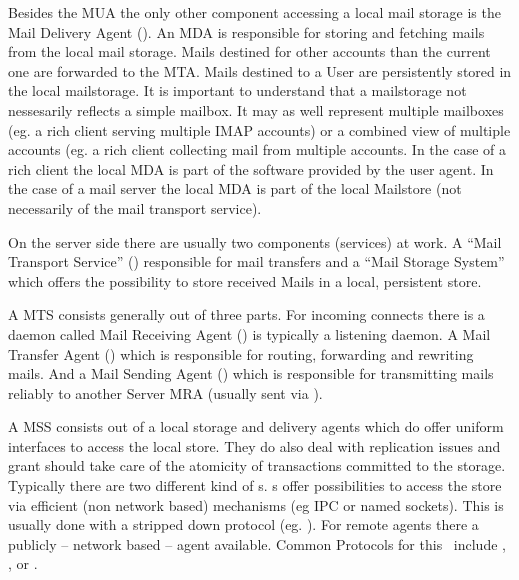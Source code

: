 Besides the MUA the only other component accessing a local mail storage is the Mail Delivery Agent (). An MDA is responsible for storing and fetching mails from the local mail storage. Mails destined for other accounts than the current one are forwarded to the MTA. Mails destined to a User are persistently stored  in the local mailstorage. It is important to understand that a mailstorage not nessesarily reflects a simple mailbox. It may as well represent multiple mailboxes (eg. a rich client serving multiple IMAP accounts) or a combined view of multiple accounts (eg. a rich client collecting mail from multiple  accounts. In the case of a rich client the local MDA is part of the software provided by the user agent. In the case of a mail server the local MDA is part of the local Mailstore (not necessarily of the mail transport service).

On the server side there are usually two components (services) at work. A ``Mail Transport Service'' () responsible for mail transfers and a ``Mail Storage System'' which offers the possibility to store received Mails in a local, persistent store.\par

A MTS consists generally out of three parts. For incoming connects there is a daemon called Mail Receiving Agent () is typically a  listening daemon. A Mail Transfer Agent () which is responsible for routing, forwarding and rewriting mails. And a Mail Sending Agent () which is responsible for transmitting mails reliably to another Server MRA (usually sent via ).\par

A MSS consists out of a local storage and delivery agents which do offer uniform interfaces to access the local store. They do also deal with replication issues and grant should take care of the atomicity of transactions committed to the storage. Typically there are two different kind of s. s offer possibilities to access the store via efficient (non network based) mechanisms (eg IPC or named sockets). This is usually done with a stripped down protocol (eg. ). For remote agents there a publicly -- network based -- agent available. Common Protocols for this \ include , , or .\par

